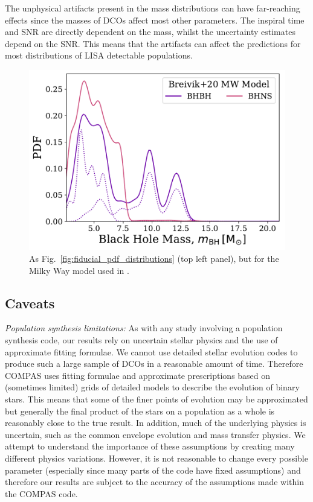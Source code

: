 The unphysical artifacts present in the mass distributions can have far-reaching effects since the masses of DCOs affect most other parameters. The inspiral time and SNR are directly dependent on the mass, whilst the uncertainty estimates depend on the SNR. This means that the artifacts can affect the predictions for most distributions of LISA detectable populations.

\begin{figure}[b]
    \centering
    \includegraphics[width=\columnwidth]{../figures/BH_mass_dist_simple_mw.pdf}
    \caption{As Fig.~\ref{fig:fiducial_pdf_distributions} (top left panel), but for the Milky Way model used in \citet{Breivik+2020}.}
    \label{fig:bh_mass_simple_mw}
\end{figure}

\subsection{Caveats}\label{sec:caveats}
\textit{Population synthesis limitations:} As with any study involving a population synthesis code, our results rely on uncertain stellar physics and the use of approximate fitting formulae. We cannot use detailed stellar evolution codes to produce such a large sample of DCOs in a reasonable amount of time. Therefore COMPAS uses fitting formulae and approximate prescriptions based on (sometimes limited) grids of detailed models to describe the evolution of binary stars. This means that some of the finer points of evolution may be approximated but generally the final product of the stars on a population as a whole is reasonably close to the true result. In addition, much of the underlying physics is uncertain, such as the common envelope evolution and mass transfer physics. We attempt to understand the importance of these assumptions by creating many different physics variations. However, it is not reasonable to change every possible parameter (especially since many parts of the code have fixed assumptions) and therefore our results are subject to the accuracy of the assumptions made within the COMPAS code.

